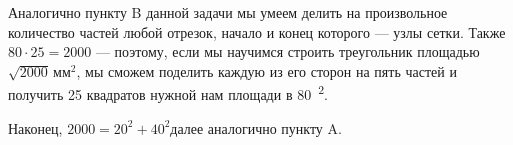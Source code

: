 \begin{itemize}
\begin{multicols}{2}
\end{multicols}

\itC Аналогично пункту B данной задачи мы умеем делить на произвольное количество частей любой отрезок, начало и конец которого — узлы сетки. Также $80 \cdot 25 = 2000$ — поэтому, если мы научимся строить треугольник площадью $\sqrt{2000}\,\text{мм}^2$, мы сможем поделить каждую из его сторон на пять частей и получить 25 квадратов нужной нам площади в \SI{80}{^2}.

Наконец, $2000 = 20^2 + 40^2$\scolon далее аналогично пункту A.
\end{itemize}